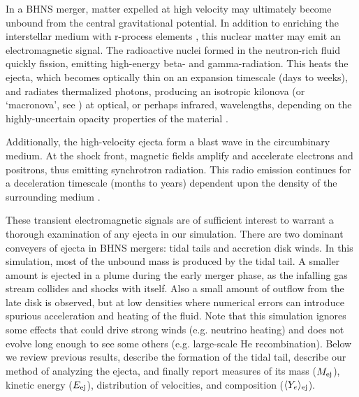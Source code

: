 In a BHNS merger, matter expelled at high velocity
may ultimately become unbound from the central gravitational potential.
In addition to enriching the interstellar medium with r-process elements
\citep{latt1974-bhns_ejecta,frei1999-r_process,arno2007-r_process,koro2012-r_process},
this nuclear matter may emit an electromagnetic signal.
The radioactive nuclei formed in the neutron-rich fluid
quickly fission, emitting high-energy beta- and gamma-radiation.
This heats the ejecta, which becomes optically thin on an expansion
timescale (days to weeks), and radiates thermalized photons, producing
an isotropic kilonova (or `macronova', see
\citealt{li1998-transients,robe2011-transients,metz2011-most_promising,ross2012-ejecta,
pira2013-em_counterparts,kase2013-opacities,niss2012-end_to_end})
at optical, or perhaps infrared, wavelengths, depending on the highly-uncertain
opacity properties of the material \citep{kase2013-opacities}.

Additionally, the high-velocity ejecta form a blast wave in the circumbinary medium.
At the shock front, magnetic fields amplify and accelerate electrons and positrons,
thus emitting synchrotron radiation.
This radio emission continues for a deceleration timescale (months to years)
dependent upon the density of the surrounding medium
\citep{metz2011-most_promising,naka2011-radio,pira2013-em_counterparts,niss2012-end_to_end}.

These transient electromagnetic signals are of sufficient interest
to warrant a thorough examination of any ejecta in our simulation.
There are two dominant conveyers of ejecta in BHNS mergers:
tidal tails and accretion disk winds.  In this simulation, most of
the unbound mass is produced by the tidal tail.  A smaller amount is
ejected in a plume during the early merger phase, as the infalling gas stream
collides and shocks with itself. Also a small amount of outflow from the late disk
is observed, but at low densities where numerical errors can introduce
spurious acceleration and heating of the fluid.
Note that this simulation ignores some effects that could drive
strong winds (e.g. neutrino heating) and does not evolve long enough to
see some others (e.g. large-scale He recombination).
Below we review previous results, describe the formation of the tidal tail,
describe our method of analyzing the ejecta, and finally report measures of
its mass ($M_{\rm ej}$), kinetic energy ($E_{\rm ej}$),
distribution of velocities, and composition ($\langle Y_e \rangle_{\rm ej}$).

